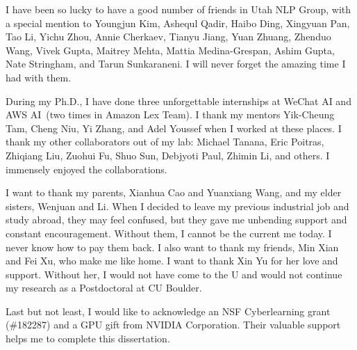 I have been so lucky to have a good number of friends in Utah NLP
Group, with a special mention to Youngjun Kim, Ashequl Qadir, Haibo
Ding, Xingyuan Pan, Tao Li, Yichu Zhou, Annie Cherkaev, Tianyu Jiang,
Yuan Zhuang, Zhenduo Wang, Vivek Gupta, Maitrey Mehta, Mattia
Medina-Grespan, Ashim Gupta, Nate Stringham, and Tarun Sunkaraneni. I
will never forget the amazing time I had with them.

During my Ph.D., I have done three unforgettable internships at WeChat
AI and AWS AI~(two times in Amazon Lex Team). I thank my mentors
Yik-Cheung Tam, Cheng Niu, Yi Zhang, and Adel Youssef when I worked at
these places. I thank my other collaborators out of my lab: Michael
Tanana, Eric Poitras, Zhiqiang Liu, Zuohui Fu, Shuo Sun, Debjyoti
Paul, Zhimin Li, and others. I immensely enjoyed the collaborations.


I want to thank my parents, Xianhua Cao and Yuanxiang Wang, and my
elder sisters, Wenjuan and Li. When I decided to leave my previous
industrial job and study abroad, they may feel confused, but they gave
me unbending support and constant encouragement. Without them, I
cannot be the current me today. I never know how to pay them back. I
also want to thank my friends, Min Xian and Fei Xu, who make me like
home. I want to thank Xin Yu for her love and support. Without her, I
would not have come to the U and would not continue my research as a
Postdoctoral at CU Boulder.

Last but not least, I would like to acknowledge an NSF Cyberlearning
grant (\#182287) and a GPU gift from NVIDIA Corporation. Their
valuable support helps me to complete this dissertation.

